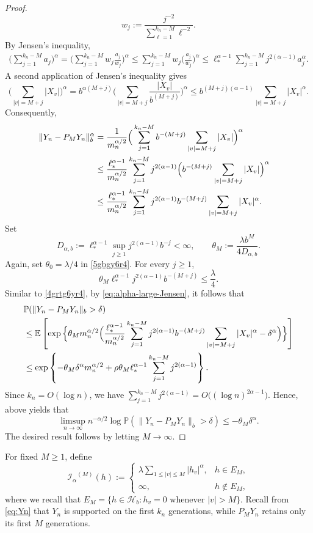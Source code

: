 \documentclass[a4paper, 11pt]{article}
\newcommand{\1}{\mathbf 1}
\theoremstyle{plain}
\begin{document}
\begin{proof}
\[  w_j:=
  \frac{j^{-2}}{\sum_{\ell=1}^{k_n-M}\ell^{-2}}.
\]
By Jensen's inequality,
\begin{align*}
  \Big(\sum_{j=1}^{k_n-M}a_j\Big)^\alpha
  =
  \Big(
    \sum_{j=1}^{k_n-M}w_j\frac{a_j}{w_j}
  \Big)^\alpha
  \leq
  \sum_{j=1}^{k_n-M}w_j
  \Big(\frac{a_j}{w_j}\Big)^\alpha
  \leq
  \ell_{*}^{\alpha-1}
  \sum_{j=1}^{k_n-M}j^{2(\alpha-1)}a_j^\alpha.
\end{align*}
A second application of Jensen's inequality gives
\[
  \Big(
    \sum_{|v|=M+j}|X_v|
  \Big)^\alpha={b^{\alpha(M+j)}}\Big(
    \sum_{|v|=M+j}\frac{|X_v|}{b^{(M+j)}}
  \Big)^\alpha
  \leq
  b^{(M+j)(\alpha-1)}
  \sum_{|v|=M+j}|X_v|^\alpha.
\]
Consequently,
\begin{align}\label{eq:alpha-large-Jensen}
  \|Y_n-P_MY_n\|_b^\alpha&=
  \frac1{m_n^{\alpha/2}}
  \Big(\sum_{j=1}^{k_n-M}b^{-(M+j)}\sum_{|v|=M+j}|X_v|\Big)^{\alpha}\cr
  &\leq
  \frac{\ell_{*}^{\alpha-1}}{m_n^{\alpha/2}}
  \sum_{j=1}^{k_n-M}j^{2(\alpha-1)}\Big(b^{-(M+j)}\sum_{|v|=M+j}|X_v|\Big)^{\alpha}\cr
&\leq
  \frac{\ell_{*}^{\alpha-1}}{m_n^{\alpha/2}}
  \sum_{j=1}^{k_n-M}
  j^{2(\alpha-1)}b^{-(M+j)}
  \sum_{|v|=M+j}|X_v|^\alpha.
\end{align}
Set
\[
  D_{\alpha,b}
  :=
  \ell_{*}^{\alpha-1}
  \sup_{j\geq1}
  j^{2(\alpha-1)}b^{-j}
  <\infty,
  \qquad
  \theta_M:=
  \frac{\lambda b^M}{4D_{\alpha,b}}.
\]
Again, set $\theta_0=\lambda/4$ in \eqref{5gbgy6r4}. For every \(j\geq1\),
\[
  \theta_M \ell_{*}^{\alpha-1}
  j^{2(\alpha-1)}b^{-(M+j)}
  \leq\frac{\lambda}{4}.
\]
Similar to \eqref{4grtg6yr4}, by \eqref{eq:alpha-large-Jensen}, it follows that
\begin{align*}
  &\mathbb{P}\!\left(\|Y_n-P_MY_n\|_b>\delta\right)\\
  &\leq
  \mathbb{E}\left[\exp\Big\{
\theta_Mm_n^{\alpha/2}\Big(\frac{\ell_{*}^{\alpha-1}}{m_n^{\alpha/2}}
  \sum_{j=1}^{k_n-M}
  j^{2(\alpha-1)}b^{-(M+j)}
  \sum_{|v|=M+j}|X_v|^\alpha-\delta^{\alpha}\Big)\Big\}\right]\cr
  &\leq
  \exp\left\{
    -\theta_M\delta^\alpha m_n^{\alpha/2}
    +\rho\theta_M \ell_{*}^{\alpha-1}
      \sum_{j=1}^{k_n-M}j^{2(\alpha-1)}
  \right\}.
\end{align*}
Since \(k_n=O(\log n)\), we have
$
  \sum_{j=1}^{k_n-M}j^{2(\alpha-1)}
  =
  O\bigl((\log n)^{2\alpha-1}\bigr).
$
Hence, above yields that
\[
  \limsup_{n\to\infty}
  n^{-\alpha/2}
  \log\mathbb{P}\!\left(\|Y_n-P_MY_n\|_b>\delta\right)
  \leq-\theta_M\delta^\alpha.
\]
The desired result follows by letting $M\to\infty$.
\end{proof}
For fixed \(M\geq1\), define
\begin{equation}\label{eq:finite-energy}
  \mathcal{I_{\alpha}}^{(M)}(h):=
  \begin{cases}
    \displaystyle
    \lambda\sum_{1\leq|v|\leq M}|h_v|^\alpha,
       &h\in E_M,\\
    \infty,&h\notin E_M,
  \end{cases}
\end{equation}
where we recall that $E_M=\{h\in\mathcal{H}_b:h_v=0\text{ whenever }|v|>M\}.$ Recall from \eqref{eq:Yn} that \(Y_n\) is supported on the first \(k_n\)
generations, while \(P_MY_n\) retains only its first \(M\) generations.
\end{document}
